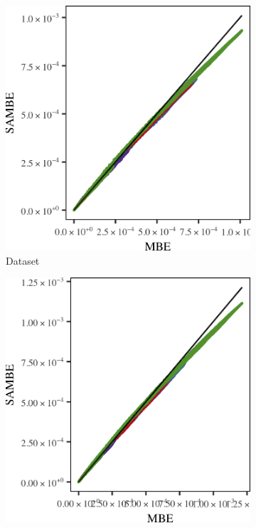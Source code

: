 		\begin{figure}
			\centering
			\begin{subfigure}{0.23\textwidth}
				\centering
				\includegraphics[keepaspectratio=true, width=\textwidth, height=0.23\textheight]{discussion/img/ferdosi_3_120000_mbe_sambe.png}
				\caption{Dataset \ferdosiThree}
				\label{fig:discussion:performance:mbevssambe:ferdosi3}
			\end{subfigure}
			\begin{subfigure}{0.23\textwidth}
				\centering
				\includegraphics[keepaspectratio=true, width=\textwidth, height=0.23\textheight]{discussion/img/baakman_3_120000_mbe_sambe.png}

\end{subfigure}
\end{figure}

